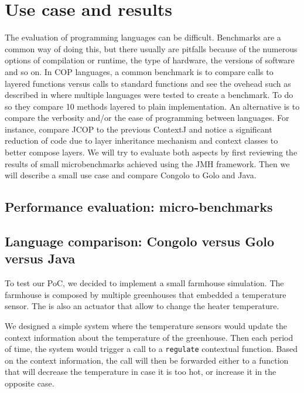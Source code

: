 \documentclass[a4paper]{article}
\begin{document}
\section{Use case and results}
\label{section:results}
The evaluation of programming languages can be difficult. Benchmarks are a common way of doing this, but there usually are pitfalls because of the numerous options of compilation or runtime, the type of hardware, the versions of software and so on. In COP languages, a common benchmark is to compare calls to layered functions versus calls to standard functions and see the ovehead such as described in \cite{appeltauer_comparison_2009} where multiple languages were tested to create a benchmark. To do so they compare 10 methods layered to plain implementation. An alternative is to compare the verbosity and/or the ease of programming between languages. For instance, \cite{appeltauer_declarative_2013} compare JCOP to the previous ContextJ and notice a significant reduction of code due to layer inheritance mechanism and context classes to better compose layers. We will try to evaluate both aspects by first reviewing the results of small microbenchmarks achieved using the JMH framework. Then we will describe a small use case and compare Congolo to Golo and Java.

\subsection{Performance evaluation: micro-benchmarks}


\subsection{Language comparison: Congolo versus Golo versus Java}

To test our PoC, we decided to implement a small farmhouse simulation. The farmhouse is composed by multiple greenhouses that embedded a temperature sensor. The is also an actuator that allow to change the heater temperature.

We designed a simple system where the temperature sensors would update the context information about the temperature of the greenhouse. Then each period of time, the system would trigger a call to a \lstinline|regulate| contextual function. Based on the context information, the call will then be forwarded either to a function that will decrease the temperature in case it is too hot, or increase it in the opposite case.
\end{document}
